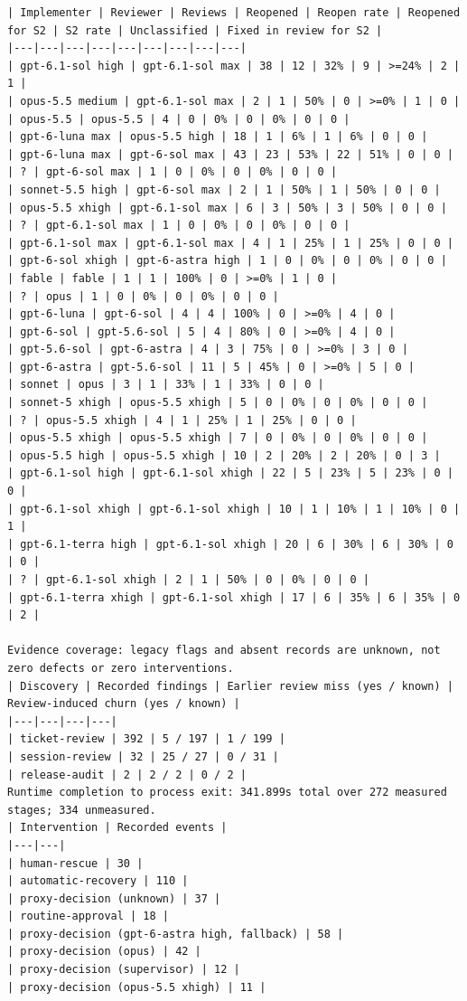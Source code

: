 \documentclass[11pt,a4paper]{article}
\begin{document}
{\begin{verbatim}
| Implementer | Reviewer | Reviews | Reopened | Reopen rate | Reopened for S2 | S2 rate | Unclassified | Fixed in review for S2 |
|---|---|---|---|---|---|---|---|---|
| gpt-6.1-sol high | gpt-6.1-sol max | 38 | 12 | 32% | 9 | >=24% | 2 | 1 |
| opus-5.5 medium | gpt-6.1-sol max | 2 | 1 | 50% | 0 | >=0% | 1 | 0 |
| opus-5.5 | opus-5.5 | 4 | 0 | 0% | 0 | 0% | 0 | 0 |
| gpt-6-luna max | opus-5.5 high | 18 | 1 | 6% | 1 | 6% | 0 | 0 |
| gpt-6-luna max | gpt-6-sol max | 43 | 23 | 53% | 22 | 51% | 0 | 0 |
| ? | gpt-6-sol max | 1 | 0 | 0% | 0 | 0% | 0 | 0 |
| sonnet-5.5 high | gpt-6-sol max | 2 | 1 | 50% | 1 | 50% | 0 | 0 |
| opus-5.5 xhigh | gpt-6.1-sol max | 6 | 3 | 50% | 3 | 50% | 0 | 0 |
| ? | gpt-6.1-sol max | 1 | 0 | 0% | 0 | 0% | 0 | 0 |
| gpt-6.1-sol max | gpt-6.1-sol max | 4 | 1 | 25% | 1 | 25% | 0 | 0 |
| gpt-6-sol xhigh | gpt-6-astra high | 1 | 0 | 0% | 0 | 0% | 0 | 0 |
| fable | fable | 1 | 1 | 100% | 0 | >=0% | 1 | 0 |
| ? | opus | 1 | 0 | 0% | 0 | 0% | 0 | 0 |
| gpt-6-luna | gpt-6-sol | 4 | 4 | 100% | 0 | >=0% | 4 | 0 |
| gpt-6-sol | gpt-5.6-sol | 5 | 4 | 80% | 0 | >=0% | 4 | 0 |
| gpt-5.6-sol | gpt-6-astra | 4 | 3 | 75% | 0 | >=0% | 3 | 0 |
| gpt-6-astra | gpt-5.6-sol | 11 | 5 | 45% | 0 | >=0% | 5 | 0 |
| sonnet | opus | 3 | 1 | 33% | 1 | 33% | 0 | 0 |
| sonnet-5 xhigh | opus-5.5 xhigh | 5 | 0 | 0% | 0 | 0% | 0 | 0 |
| ? | opus-5.5 xhigh | 4 | 1 | 25% | 1 | 25% | 0 | 0 |
| opus-5.5 xhigh | opus-5.5 xhigh | 7 | 0 | 0% | 0 | 0% | 0 | 0 |
| opus-5.5 high | opus-5.5 xhigh | 10 | 2 | 20% | 2 | 20% | 0 | 3 |
| gpt-6.1-sol high | gpt-6.1-sol xhigh | 22 | 5 | 23% | 5 | 23% | 0 | 0 |
| gpt-6.1-sol xhigh | gpt-6.1-sol xhigh | 10 | 1 | 10% | 1 | 10% | 0 | 1 |
| gpt-6.1-terra high | gpt-6.1-sol xhigh | 20 | 6 | 30% | 6 | 30% | 0 | 0 |
| ? | gpt-6.1-sol xhigh | 2 | 1 | 50% | 0 | 0% | 0 | 0 |
| gpt-6.1-terra xhigh | gpt-6.1-sol xhigh | 17 | 6 | 35% | 6 | 35% | 0 | 2 |

Evidence coverage: legacy flags and absent records are unknown, not zero defects or zero interventions.
| Discovery | Recorded findings | Earlier review miss (yes / known) | Review-induced churn (yes / known) |
|---|---|---|---|
| ticket-review | 392 | 5 / 197 | 1 / 199 |
| session-review | 32 | 25 / 27 | 0 / 31 |
| release-audit | 2 | 2 / 2 | 0 / 2 |
Runtime completion to process exit: 341.899s total over 272 measured stages; 334 unmeasured.
| Intervention | Recorded events |
|---|---|
| human-rescue | 30 |
| automatic-recovery | 110 |
| proxy-decision (unknown) | 37 |
| routine-approval | 18 |
| proxy-decision (gpt-6-astra high, fallback) | 58 |
| proxy-decision (opus) | 42 |
| proxy-decision (supervisor) | 12 |
| proxy-decision (opus-5.5 xhigh) | 11 |
\end{verbatim}
}
\end{document}
